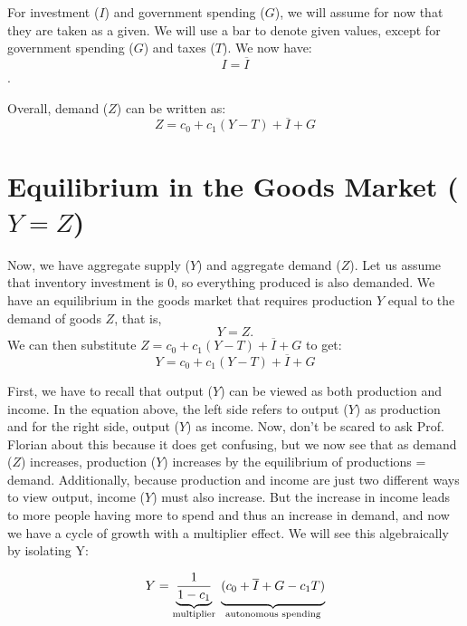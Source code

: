 \documentclass{extarticle}
\begin{document}
For investment ($I$) and government spending ($G$), we will assume for now that they are taken as a given. We will use a bar to denote given values, except for government spending ($G$) and taxes ($T$). We now have:
$$I = \overline{I}$$.

\noindent Overall, demand ($Z$) can be written as:
$$Z = c_0 + c_1(Y-T) + \overline{I} + G$$

\section{Equilibrium in the Goods Market ($Y = Z$)}
Now, we have aggregate supply ($Y$) and aggregate demand ($Z$). Let us assume that inventory investment is 0, so everything produced is also demanded. We have an equilibrium in the goods market that requires production $Y$ equal to the demand of goods $Z$, that is, $$Y = Z.$$
We can then substitute $Z = c_0 + c_1(Y-T) + \overline{I} + G$ to get:
$$Y = c_0 + c_1(Y-T) + \overline{I} + G$$

\noindent First, we have to recall that output ($Y$) can be viewed as both production and income. In the equation above, the left side refers to output ($Y$) as production and for the right side, output ($Y$) as income. Now, don't be scared to ask Prof. Florian about this because it does get confusing, but we now see that as demand ($Z$) increases, production ($Y$) increases by the equilibrium of productions = demand. Additionally, because production and income are just two different ways to view output, income ($Y$) must also increase. But the increase in income leads to more people having more to spend and thus an increase in demand, and now we have a cycle of growth with a multiplier effect. We will see this algebraically by isolating Y:

$$
Y = \underbrace{\frac{1}{1 - c_1}}_{\text{multiplier}}
    \;\underbrace{(c_0 + \overline{I} + G - c_1 T)\vphantom{\frac{1}{1-c_1}}}_{\text{autonomous spending}}
$$
\end{document}
